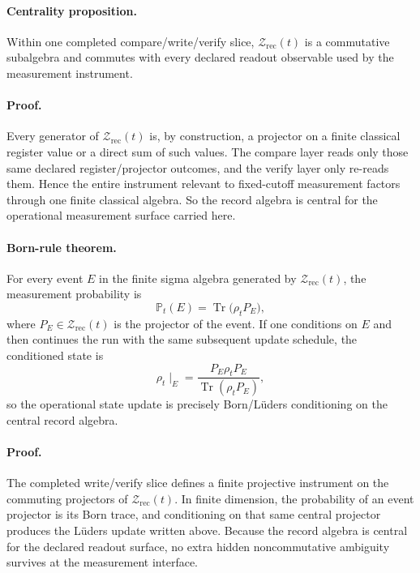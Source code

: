 \documentclass[11pt]{article}
\begin{document}
\paragraph{Centrality proposition.}
Within one completed compare/write/verify slice, $\mathcal Z_{\mathrm{rec}}(t)$ is a commutative
subalgebra and commutes with every declared readout observable used by the measurement instrument.

\paragraph{Proof.}
Every generator of $\mathcal Z_{\mathrm{rec}}(t)$ is, by construction, a projector on a finite
classical register value or a direct sum of such values. The compare layer reads only those same
declared register/projector outcomes, and the verify layer only re-reads them. Hence the entire
instrument relevant to fixed-cutoff measurement factors through one finite classical algebra. So
the record algebra is central for the operational measurement surface carried here.

\paragraph{Born-rule theorem.}
For every event $E$ in the finite sigma algebra generated by $\mathcal Z_{\mathrm{rec}}(t)$, the
measurement probability is
\begin{equation}
\mathbb P_t(E)=\operatorname{Tr}\!\bigl(\rho_t P_E\bigr),
\end{equation}
where $P_E\in\mathcal Z_{\mathrm{rec}}(t)$ is the projector of the event. If one conditions on
$E$ and then continues the run with the same subsequent update schedule, the conditioned state is
\begin{equation}
\rho_t\!\mid_E
=
\frac{P_E\rho_t P_E}{\operatorname{Tr}(\rho_t P_E)},
\end{equation}
so the operational state update is precisely Born/L\"uders conditioning on the central record
algebra.

\paragraph{Proof.}
The completed write/verify slice defines a finite projective instrument on the commuting
projectors of $\mathcal Z_{\mathrm{rec}}(t)$. In finite dimension, the probability of an event
projector is its Born trace, and conditioning on that same central projector produces the
L\"uders update written above. Because the record algebra is central for the declared readout
surface, no extra hidden noncommutative ambiguity survives at the measurement interface.
\end{document}
